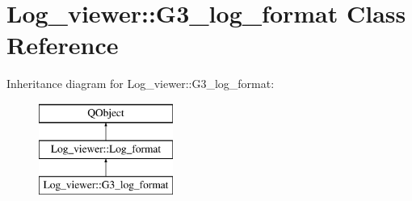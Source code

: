 \hypertarget{class_log__viewer_1_1_g3__log__format}{\section{Log\-\_\-viewer\-:\-:G3\-\_\-log\-\_\-format Class Reference}
\label{class_log__viewer_1_1_g3__log__format}
}
Inheritance diagram for Log\-\_\-viewer\-:\-:G3\-\_\-log\-\_\-format\-:\begin{figure}[H]
\begin{center}
\leavevmode
\includegraphics[height=3.000000cm]{class_log__viewer_1_1_g3__log__format}
\end{center}
\end{figure}

